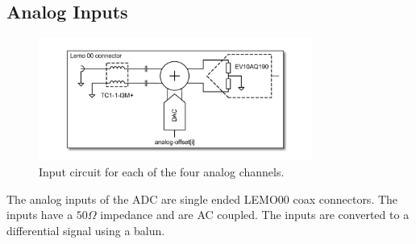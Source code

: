 	\subsection{Analog Inputs}
		\begin{figure}[hb]
			\begin{center}
				\includegraphics[width=0.8\textwidth]{figures/InputCircuit.pdf}
				\caption{Input circuit for each of the four analog channels.}
			\end{center}
		\end{figure}
		The analog inputs of the ADC are single ended LEMO00 coax connectors. The inputs have a $50\Omega$ impedance and are AC coupled. The inputs are converted to a differential signal using a balun.
